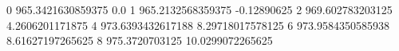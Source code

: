 0 965.3421630859375 0.0
1 965.2132568359375 -0.12890625
2 969.602783203125 4.2606201171875
4 973.6393432617188 8.29718017578125
6 973.9584350585938 8.61627197265625
8 975.3720703125 10.0299072265625
